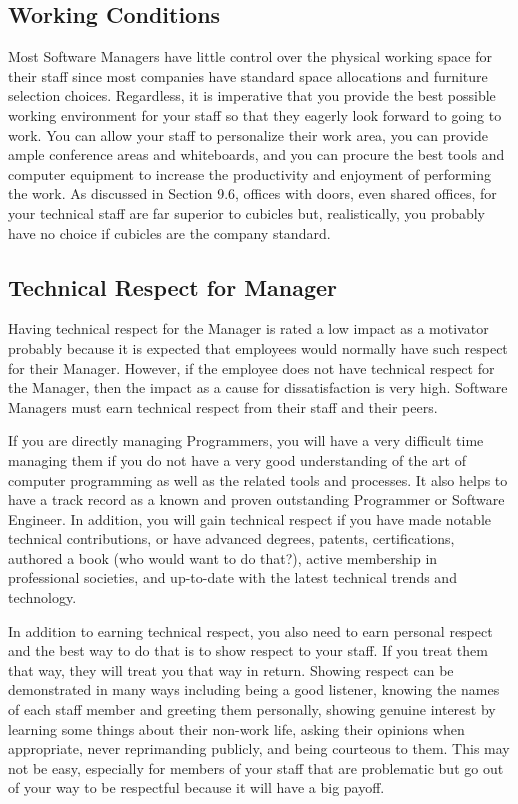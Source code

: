 \documentclass{book}
\begin{document}
\subsection{ Working Conditions}

Most Software Managers have little control over the physical
working space for their staff since most companies have
standard space allocations and furniture selection choices.
Regardless, it is imperative that you provide the best possible
working environment for your staff so that they eagerly look
forward to going to work. You can allow your staff to personalize
their work area, you can provide ample conference
areas and whiteboards, and you can procure the best tools
and computer equipment to increase the productivity and
enjoyment of performing the work. As discussed in Section
9.6, offices with doors, even shared offices, for your technical
staff are far superior to cubicles but, realistically, you probably
have no choice if cubicles are the company standard.

\subsection{Technical Respect for Manager}

Having technical respect for the Manager is rated a low
impact as a motivator probably because it is expected that
employees would normally have such respect for their
Manager. However, if the employee does not have technical
respect for the Manager, then the impact as a cause for dissatisfaction
is very high. Software Managers must earn technical
respect from their staff and their peers.

If you are directly managing Programmers, you will have
a very difficult time managing them if you do not have a
very good understanding of the art of computer programming
as well as the related tools and processes. It also helps
to have a track record as a known and proven outstanding
Programmer or Software Engineer. In addition, you will
gain technical respect if you have made notable technical
contributions, or have advanced degrees, patents, certifications,
authored a book (who would want to do that?), active
membership in professional societies, and up-to-date with
the latest technical trends and technology.

In addition to earning technical respect, you also need to
earn personal respect and the best way to do that is to show
respect to your staff. If you treat them that way, they will treat
you that way in return. Showing respect can be demonstrated
in many ways including being a good listener, knowing the
names of each staff member and greeting them personally,
showing genuine interest by learning some things about their
non-work life, asking their opinions when appropriate, never
reprimanding publicly, and being courteous to them. This
may not be easy, especially for members of your staff that are
problematic but go out of your way to be respectful because
it will have a big payoff.
\end{document}

